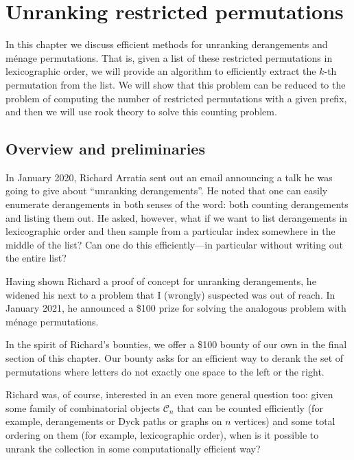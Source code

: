\chapter{Unranking restricted permutations}
\label{cha:UnrankingMenage}

In this chapter we discuss efficient methods for unranking derangements and
m\'enage permutations.
That is, given a list of these restricted permutations in lexicographic order,
we will provide an algorithm to efficiently extract the $k$-th permutation from
the list.
We will show that this problem can be reduced to the problem of computing the
number of restricted permutations with a given prefix, and then we will
use rook theory to solve this counting problem.

\section{Overview and preliminaries}
In January 2020, Richard Arratia sent out an email announcing a talk he was
going to give about ``unranking derangements''.
He noted that one can easily enumerate derangements in both senses of the word:
both counting derangements and listing them out. He asked, however, what if
we want to list derangements in lexicographic order and then sample from a
particular index somewhere in the middle of the list? Can one do this
efficiently---in particular without writing out the entire list?

Having shown Richard a proof of concept for unranking derangements, he widened
his next to a problem that I (wrongly) suspected was out of reach.
In January 2021, he announced a \$100 prize for solving the analogous problem
with m\'enage permutations.

In the spirit of Richard's bounties, we offer a \$100 bounty of our own in the
final section of this chapter. Our bounty asks for an efficient way to
derank the set of permutations where letters do not exactly one space to the
left or the right.

Richard was, of course, interested in an even more general question too:
given some family of combinatorial objects $\mathcal{C}_n$ that can be counted
efficiently (for example, derangements or Dyck paths or graphs on $n$ vertices)
and some total ordering on them (for example, lexicographic order),
when is it possible to unrank the collection in some computationally
efficient way?

